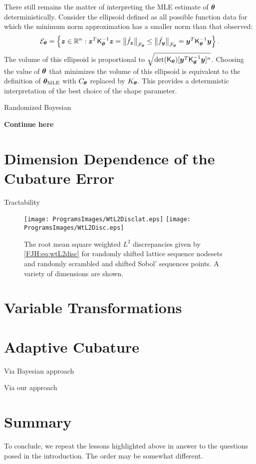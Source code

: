 \documentclass[graybox,footinfo]{svmult}
\begin{document}
There still remains the matter of interpreting the MLE estimate of ${\boldsymbol{\theta}}$ 
deterministically.  Consider the ellipsoid defined as all possible function data for 
which the minimum norm approximation has a smaller norm than that observed:
\[
{\mathcal{E}}_{\boldsymbol{\theta}} = \left\{ {\boldsymbol{z}} \in {\mathbb{R}}^n :  {\boldsymbol{z}}^T 
\mathsf{K}_{\boldsymbol{\theta}}^{-1} {\boldsymbol{z}} = \left \lVert \tilde{f}_{\boldsymbol{z}} \right \rVert_{{\mathcal{F}}_{\boldsymbol{\theta}}} \le 
\left \lVert \tilde{f}_{\boldsymbol{y}} \right \rVert_{{\mathcal{F}}_{\boldsymbol{\theta}}} =  {\boldsymbol{y}}^T 
\mathsf{K}_{\boldsymbol{\theta}}^{-1} {\boldsymbol{y}} \right\}.
\]
The volume of this ellipsoid is proportional to $\sqrt{\det(\mathsf{K}_{\boldsymbol{\theta}}) [ {\boldsymbol{y}}^T 
	\mathsf{K}_{\boldsymbol{\theta}}^{-1} {\boldsymbol{y}}]^n}$.  Choosing the value of ${\boldsymbol{\theta}}$ that minimizes 
	the volume of this ellipsoid is equivalent to the definition of ${\boldsymbol{\theta}}_{\text{MLE}}$ with 
	$C_{\boldsymbol{\theta}}$ replaced by $K_{\boldsymbol{\theta}}$.  This provides a determnistic interpretation of 
	the best choice of the shape parameter.


Randomized Bayesian



\textbf{Continue here}


\section{Dimension Dependence of the Cubature Error} \label{FJH:sec:Tract}

Tractability



\begin{figure}
	\centering
	\texttt{[image: ProgramsImages/WtL2Disclat.eps]}   \qquad 
	\texttt{[image: ProgramsImages/WtL2Disc.eps]} 
	\caption{The root mean square weighted $L^2$ discrepancies given by 
	\eqref{FJH:eq:wtL2disc} 
		for randomly shifted 
		lattice sequence nodesets and randomly scrambled and shifted Sobol' sequences 
		points.  A variety of dimensions are shown.
		\label{FJH:fig:wtdiscdiffpts}}
\end{figure}

\section{Variable Transformations}

\section{Adaptive Cubature}
Via Bayesian approach

Via our approach


\section{Summary}
To conclude, we repeat the lessons highlighted above in answer to the questions posed 
in the 
introduction.  The order may be somewhat different.
\end{document}
